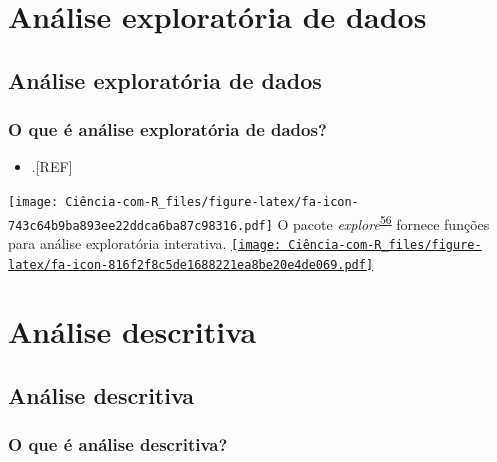 \documentclass[
]{book}
\providecommand{\tightlist}{%
  \setlength{\itemsep}{0pt}\setlength{\parskip}{0pt}}
\begin{document}
\hypertarget{analise-exploratoria-dados}{%
\chapter{\texorpdfstring{\textbf{Análise exploratória de dados}}{Análise exploratória de dados}}\label{analise-exploratoria-dados}}

\hypertarget{analise-exploratoria}{%
\section{Análise exploratória de dados}\label{analise-exploratoria}}

\hypertarget{o-que-uxe9-anuxe1lise-exploratuxf3ria-de-dados}{%
\subsection{O que é análise exploratória de dados?}\label{o-que-uxe9-anuxe1lise-exploratuxf3ria-de-dados}}

\begin{itemize}
\tightlist
\item
  .{[}REF{]}
\end{itemize}

\texttt{[image: Ciência-com-R\_files/figure-latex/fa-icon-743c64b9ba893ee22ddca6ba87c98316.pdf]} O pacote \emph{explore}\textsuperscript{\protect\hyperlink{ref-explore}{56}} fornece funções para análise exploratória interativa. \href{https://cran.r-project.org/web/packages/explore/vignettes/explore.html}{\texttt{[image: Ciência-com-R\_files/figure-latex/fa-icon-816f2f8c5de1688221ea8be20e4de069.pdf]}}

\hypertarget{analise-descritiva}{%
\chapter{\texorpdfstring{\textbf{Análise descritiva}}{Análise descritiva}}\label{analise-descritiva}}

\hypertarget{descritiva}{%
\section{Análise descritiva}\label{descritiva}}

\hypertarget{o-que-uxe9-anuxe1lise-descritiva}{%
\subsection{O que é análise descritiva?}\label{o-que-uxe9-anuxe1lise-descritiva}}
\end{document}
